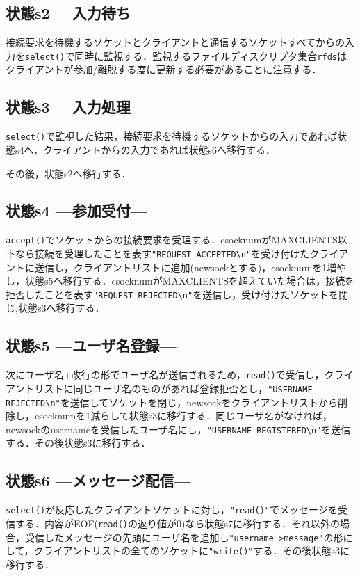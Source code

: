 \documentclass[a4j,10pt,titlepage]{jsarticle}
\begin{document}
\subsection{状態s2 ---入力待ち---}
接続要求を待機するソケットとクライアントと通信するソケットすべてからの入力を\verb|select()|で同時に監視する．監視するファイルディスクリプタ集合\verb|rfds|はクライアントが参加/離脱する度に更新する必要があることに注意する．

\subsection{状態s3 ---入力処理---}
\verb|select()|で監視した結果，接続要求を待機するソケットからの入力であれば状態s4へ，クライアントからの入力であれば状態s6へ移行する．

その後，状態s2へ移行する．

\subsection{状態s4 ---参加受付---}
\verb|accept()|でソケットからの接続要求を受理する．csocknumがMAXCLIENTS以下なら接続を受理したことを表す\verb|"REQUEST ACCEPTED\n"|を受け付けたクライアントに送信し，クライアントリストに追加(newsockとする)，csocknumを1増やし，状態s5へ移行する．csocknumがMAXCLIENTSを超えていた場合は，接続を拒否したことを表す\verb|"REQUEST REJECTED\n"|を送信し，受け付けたソケットを閉じ,状態s3へ移行する．

\subsection{状態s5 ---ユーザ名登録---}
次にユーザ名+改行の形でユーザ名が送信されるため，\verb|read()|で受信し，クライアントリストに同じユーザ名のものがあれば登録拒否とし，\verb|"USERNAME REJECTED\n"|を送信してソケットを閉じ，newsockをクライアントリストから削除し，csocknumを1減らして状態s3に移行する．同じユーザ名がなければ，newsockのusernameを受信したユーザ名にし，\verb|"USERNAME REGISTERED\n"|を送信する．その後状態s3に移行する．

\subsection{状態s6 ---メッセージ配信---}
\verb|select()|が反応したクライアントソケットに対し，\verb|"read()"|でメッセージを受信する．内容がEOF(\verb|read()|の返り値が0)なら状態s7に移行する．それ以外の場合，受信したメッセージの先頭にユーザ名を追加し\verb|"username >message"|の形にして，クライアントリストの全てのソケットに\verb|"write()"|する．その後状態s3に移行する．
\end{document}
